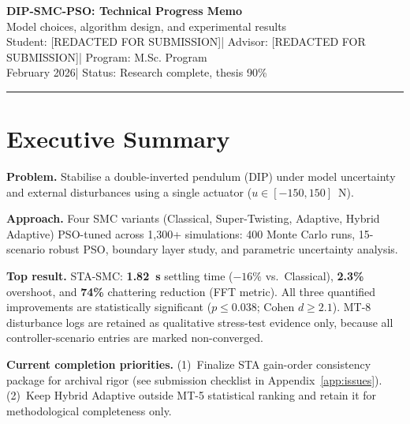 \documentclass[10pt, a4paper]{article}
\newcommand{\ReportTitle}{DIP-SMC-PSO: Technical Progress Memo}
\newcommand{\ReportSubtitle}{Model choices, algorithm design, and experimental results}
\newcommand{\ReportDate}{February 2026}
\newcommand{\ReportStatus}{Research complete, thesis 90\%}
\newcommand{\StudentName}{[REDACTED FOR SUBMISSION]}
\newcommand{\AdvisorName}{[REDACTED FOR SUBMISSION]}
\newcommand{\ProgramName}{M.Sc. Program}
\newif\ifTwoColumnReport
\newcommand{\ReportColumnSep}{0.75cm}
\newcommand{\ReportBodyFont}{\small}
\begin{document}

\ifTwoColumnReport
  \setlength{\columnsep}{\ReportColumnSep}
  \twocolumn
\fi
\ReportBodyFont

\begin{center}
  {\LARGE\bfseries\color{headblue}
    \ReportTitle}\\[0.4em]
  {\large \ReportSubtitle}\\[0.2em]
  {\small Student: \StudentName \quad|\quad
    Advisor: \AdvisorName \quad|\quad
    Program: \ProgramName}\\[0.2em]
  {\small \ReportDate \quad|\quad
    Status: \ReportStatus}
\end{center}
\vspace{-0.5em}
\noindent\textcolor{headblue}{\rule{\linewidth}{1pt}}
\vspace{0.5em}

\section*{Executive Summary}

\textbf{Problem.} Stabilise a double-inverted pendulum (DIP) under model uncertainty
and external disturbances using a single actuator ($u \in [-150,150]$~N).

\textbf{Approach.} Four SMC variants (Classical, Super-Twisting, Adaptive, Hybrid
Adaptive) PSO-tuned across 1,300+ simulations: 400 Monte Carlo runs, 15-scenario
robust PSO, boundary layer study, and parametric uncertainty analysis.

\textbf{Top result.} STA-SMC: \textbf{1.82~s} settling time ($-16\%$ vs.\ Classical),
\textbf{2.3\%} overshoot, and \textbf{74\%} chattering reduction (FFT metric).
All three quantified improvements are statistically significant
($p \le 0.038$; Cohen $d \ge 2.1$).
MT-8 disturbance logs are retained as qualitative stress-test evidence only,
because all controller-scenario entries are marked non-converged.

\textbf{Current completion priorities.}
(1)~Finalize STA gain-order consistency package for archival rigor
(see submission checklist in Appendix~\ref{app:issues}).
(2)~Keep Hybrid Adaptive outside MT-5 statistical ranking and retain it
for methodological completeness only.
\end{document}
